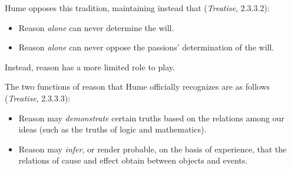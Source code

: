 Hume opposes this tradition, maintaining instead that (\emph{Treatise}, 2.3.3.2):

\begin{itemize}
    \item Reason \emph{alone} can never determine the will.
    \item Reason \emph{alone} can never oppose the passions' determination of the will.
\end{itemize}

Instead, reason has a more limited role to play. \change

% 


The two functions of reason that Hume officially recognizes are as follows (\emph{Treatise}, 2.3.3.3):

\begin{itemize}
    \item Reason may \emph{demonstrate} certain truths based on the relations among our ideas (such as the truths of logic and mathematics).
    \item Reason may \emph{infer}, or render probable, on the basis of experience, that the relations of cause and effect obtain between objects and events.
\end{itemize}

